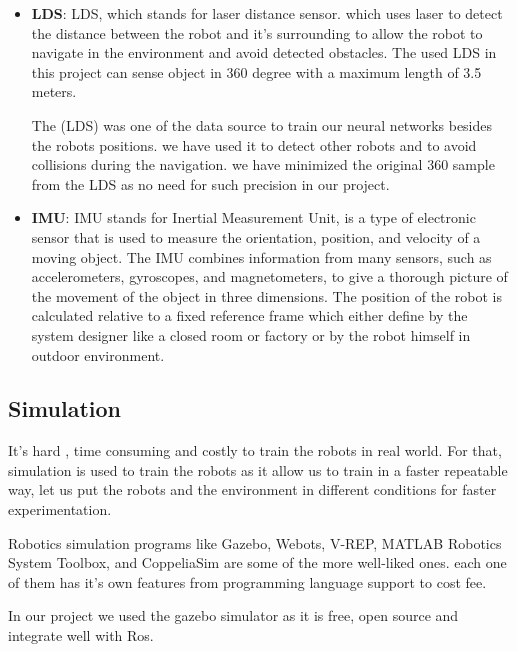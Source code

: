 \documentclass[12pt]{extarticle}
\begin{document}
\begin{itemize}
\item \textbf{LDS}:  LDS, which stands for laser distance sensor. which uses laser to detect the distance between the robot and it's surrounding to allow the robot to navigate in the environment and avoid detected obstacles. The used LDS in this project can  sense object in 360 degree with a maximum length of 3.5 meters.
 
The (LDS) was one of the data  source to train our neural networks besides the robots positions. we have used it to detect other robots and to avoid collisions during the navigation. we have minimized the original 360 sample from the LDS as no need for such precision in our project. 

     
\item \textbf{IMU}: IMU stands for Inertial Measurement Unit, is a type of electronic sensor that is used to measure the orientation, position, and velocity of a moving object. The IMU combines information from many sensors, such as accelerometers, gyroscopes, and magnetometers, to give a thorough picture of the movement of the object in three dimensions. The position of the robot is calculated relative to a fixed  reference frame which either define by the system designer like a closed room or factory or by the robot himself in outdoor environment.







\end{itemize}

   



\subsection{Simulation}
It's hard , time consuming and  costly to train the robots in real world. For that, simulation is used to train the robots as it allow us to train in a faster repeatable way,  let us put the robots and the environment  in different conditions  for faster experimentation.


Robotics simulation programs like Gazebo, Webots, V-REP, MATLAB Robotics System Toolbox, and CoppeliaSim are some of the more well-liked ones. each one of them has it's own features from programming language support to cost fee.

In our project we used the gazebo simulator as it is free, open source and integrate well with Ros.
\end{document}
